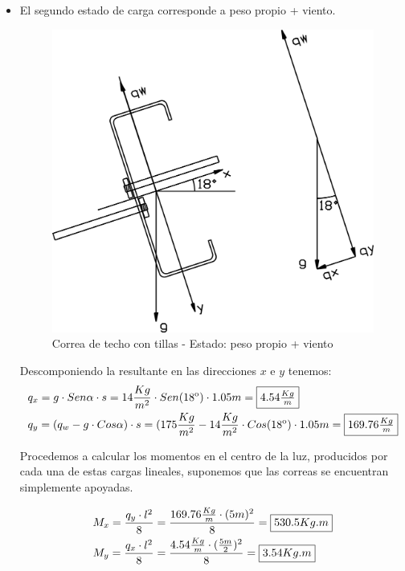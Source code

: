 \begin{itemize}
\newpage
\item El segundo estado de carga corresponde a peso propio + viento.

\begin{figure}[H]
\begin{center}
     \includegraphics[scale = 1]{chapters/chapter_2/images/figura4.png}
\caption{Correa de techo con tillas - Estado: peso propio + viento}
\end{center}
\end{figure}

Descomponiendo la resultante en las direcciones $x$ e $y$ tenemos:
\begin{align*}
& q_x=g \cdot Sen \alpha \cdot s = 14 \frac{Kg}{m^2} \cdot Sen(18\textsuperscript{o}) \cdot 1.05m= \framebox{$4.54 \frac{Kg}{m}$}\\
& q_y=(q_w - g \cdot Cos \alpha) \cdot s = (175 \frac{Kg}{m^2} - 14 \frac{Kg}{m^2} \cdot Cos(18\textsuperscript{o}) \cdot 1.05m= \framebox{$169.76 \frac{Kg}{m}$}
\end{align*}

Procedemos a calcular los momentos en el centro de la luz, producidos por cada una de estas cargas lineales, suponemos que las correas se encuentran simplemente apoyadas.

\begin{align*}
& M_x= \frac{q_y \cdot l^2}{8} = \frac{169.76 \frac{Kg}{m} \cdot (5m)^2}{8} = \framebox{$530.5 Kg.m$} \\
& M_y= \frac{q_x \cdot l^2}{8} = \frac{4.54 \frac{Kg}{m} \cdot (\frac{5m}{2})^2}{8} = \framebox{$3.54 Kg.m$}
\end{align*}


\end{itemize}
